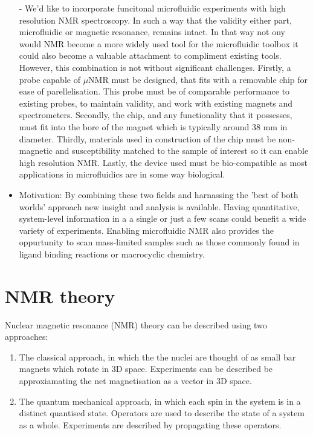 \begin{itemize}
- We'd like to incorporate funcitonal microfluidic experiments with high resolution NMR spectroscopy. In
such a way that the validity either part, microfluidic or magnetic resonance, remains intact. In that
way not ony would NMR become a more widely used tool for the microfluidic toolbox it could also
become a valuable attachment to compliment existing tools. However, this combination
is not without significant challenges. Firstly, a probe capable of $\mu$NMR must be designed, that fits
with a removable chip for ease of parellelisation. This probe must be of comparable performance
to existing probes, to maintain validity, and work with existing magnets and spectrometers. Secondly, the
chip, and any functionality that it possesses, must fit into the bore of the magnet which is typically around
38 mm in diameter. Thirdly, materials used in construction of the chip must be non-magnetic and susceptibility
matched to the sample of interest so it can enable high resolution NMR. Lastly, the device used must be
bio-compatible as most applications in microfluidics are in some way biological.
  \item Motivation: By combining these two fields and harnassing the 'best of both worlds' approach
new insight and analysis is available. Having quantitative, system-level information in a
a single or just a few scans could benefit a wide variety of experiments. Enabling microfluidic
NMR also provides the oppurtunity to scan mass-limited samples such as those commonly found in
ligand binding reactions or macrocyclic chemistry.


\end{itemize}

\section{NMR theory}

Nuclear magnetic resonance (NMR) theory can be described using two approaches:
\begin{enumerate}
  \item The classical approach, in which the the nuclei are thought of as small bar magnets which
  rotate in 3D space. Experiments can be described be approxiamating the net magnetisation as a
  vector in 3D space.
  \item The quantum mechanical approach, in which each spin in the system is in a distinct quantised state.
  Operators are used to describe the state of a system as a whole. Experiments are described by propagating
  these operators.
\end{enumerate}

